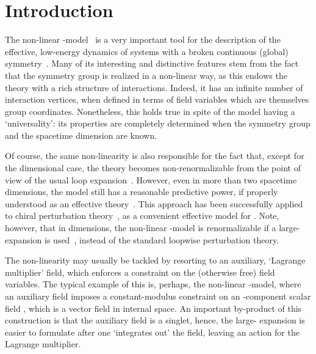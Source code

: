 \documentclass[a4paper,12pt]{article}
\begin{document}
\section{Introduction}\label{sec:intro}
The non-linear \myHighlight{$\sigma$}\coordHE{}-model~\cite{weinberg1} is a very important
tool for the description of the effective, low-energy dynamics of
systems with a broken continuous (global) symmetry~\cite{zinn}. Many
of its interesting and distinctive features stem from the fact that
the symmetry group is realized in a non-linear way, as this endows the
theory with a rich structure of interactions. Indeed, it has an
infinite number of interaction vertices, when defined in terms of
field variables which are themselves group coordinates.  Nonetheless,
this holds true in spite of the model having a `universality': its
properties are completely determined when the symmetry group and the
spacetime dimension are known.

Of course, the same non-linearity is also responsible for the fact
that, except for the \coordHE{} dimensional case, the theory becomes
non-renormalizable from the point of view of the usual loop
expansion~\cite{zinn}.  However, even in more than two spacetime
dimensions, the model still has a reasonable predictive power, if
properly understood as an effective theory~\cite{weinberg2}.  This
approach has been successfully applied to chiral perturbation
theory~\cite{cpt}, as a convenient effective model for \coordHE{}.  Note,
however, that in \coordHE{} dimensions, the non-linear \myHighlight{$\sigma$}\coordHE{}-model is
renormalizable if a large-\coordHE{} expansion is used~\cite{largen}, instead
of the standard loopwise perturbation theory.

The non-linearity may usually be tackled by resorting to an auxiliary,
`Lagrange multiplier' field, which enforces a constraint on the
(otherwise free) field variables. The typical example of this is,
perhaps, the \coordHE{} non-linear \myHighlight{$\sigma$}\coordHE{}-model, where an auxiliary
field imposes a constant-modulus constraint on an \coordHE{}-component scalar
field \coordHE{}, which is a vector
field in internal space.  An important by-product of this construction
is that the auxiliary field is a \coordHE{} singlet, hence, the large-\coordHE{}
expansion is easier to formulate after one `integrates out' the \myHighlight{$\phi$}\coordHE{}
field, leaving an action for the Lagrange multiplier.
\end{document}
